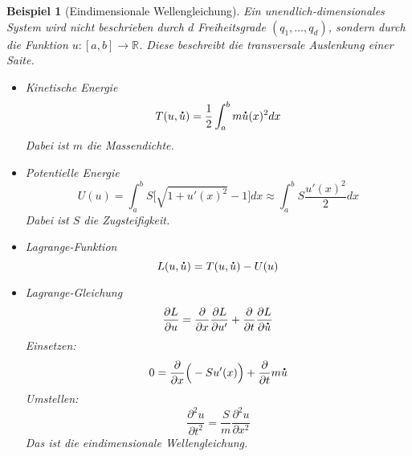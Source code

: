 \documentclass[german]{scrreprt}
\newcommand{\R}{\mathbb R}
\theoremstyle{plain}
\theoremstyle{nonumberplain}
\theoremstyle{nonumberplain}
\newtheorem{bsp}{Beispiel}
\theoremstyle{nonumberplain}
\renewcommand*{\dot}[1]{\accentset{\mbox{\large\bfseries .}}{#1}}
\begin{document}
\begin{bsp}[Eindimensionale Wellengleichung]
	Ein unendlich-dimensionales System wird nicht beschrieben durch $d$
	Freiheitsgrade $(q_1, \dots, q_d)$, sondern durch die Funktion $u: [a, b] \to \R$. Diese beschreibt die transversale Auslenkung einer Saite.
	\begin{itemize}
		\item Kinetische Energie
		\begin{equation*}
			T(u, \dot u) = \frac12 \int_a^b m \dot u(x)^2 dx
		\end{equation*}
		Dabei ist $m$ die Massendichte.
		\item Potentielle Energie
		\begin{equation*}
			U(u)
			=
			\int_a^b S \Big[ \sqrt{1+ u'(x)^2} -1 \Big] dx
			\approx
			\int_a^b S\frac{u'(x)^2}{2} dx
		\end{equation*}
		Dabei ist $S$ die Zugsteifigkeit.
		\item Lagrange-Funktion
		\begin{equation*}
			L(u, \dot u) = T(u, \dot u) - U(u)
		\end{equation*}
		\item Lagrange-Gleichung
		\begin{equation*}
			\frac{\partial L}{\partial u}
			=
			\frac{\partial}{\partial x} \frac{\partial L}{\partial u'}
			+ \frac{\partial}{\partial t} \frac{\partial L}{\partial \dot{u}}
		\end{equation*}
		Einsetzen:
		\begin{equation*}
			0 =
			\frac{\partial}{\partial x} \Big(- S u'(x)\Big)
			+ \frac{\partial}{\partial t}m\dot{u}
		\end{equation*}
		Umstellen:
		\begin{equation*}
			\frac{\partial^2 u}{\partial t^2} = \frac{S}{m} \frac{\partial^2 u}{\partial x^2}
		\end{equation*}
		Das ist die eindimensionale Wellengleichung.
	\end{itemize}
\end{bsp}





\end{document}
